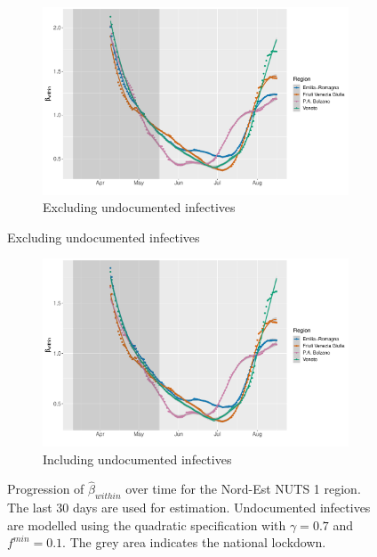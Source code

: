\documentclass[12pt]{article}
\begin{document}
	\begin{figure}[H]
	    \centering
	    \begin{subfigure}{\textwidth}
	      \centering
	      \includegraphics[width=0.91\linewidth]{output/model_within_lag14_betawithin_Nord-Est_rollingwindow30.pdf}
	      \caption{Excluding undocumented infectives}
	      \label{fig:model_within_nordest_lowsample_regular}
	    \end{subfigure}
    \end{figure}
    \begin{figure}[H]\ContinuedFloat
	    \begin{subfigure}{\textwidth}
	      \centering
	      \includegraphics[width=0.91\linewidth]{output/model_within_lag14_betawithin_Nord-Est_UndocQuadratic_rollingwindow30.pdf}
	      \caption{Including undocumented infectives}
	      \label{fig:model_within_nordest_lowsample_undoc}
	    \end{subfigure}
	    \caption{Progression of $\widehat{\beta}_{within}$ over time for the Nord-Est NUTS 1 region. The last 30 days are used for estimation. Undocumented infectives are modelled using the quadratic specification with $\gamma = 0.7$ and $f^{min}=0.1$. The grey area indicates the national lockdown.}
	    \label{fig:model_within_nordest_lowsample}
    \end{figure}
	
\end{document}
